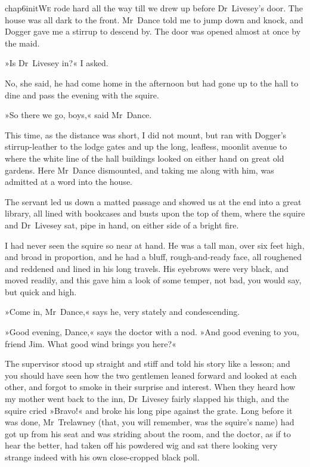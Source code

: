 

\lettrine[lines=5,image=true,findent=2pt]{chap6initW}{e} rode hard all the way till we drew up before Dr~Livesey's door. The house was all dark to the front. Mr~Dance told me to jump down and knock, and Dogger gave me a stirrup to descend by. The door was opened almost at once by the maid.

»Is Dr~Livesey in?« I asked.

No, she said, he had come home in the afternoon but had gone up to the hall to dine and pass the evening with the squire.

»So there we go, boys,« said Mr~Dance.

This time, as the distance was short, I did not mount, but ran with Dogger's stirrup-leather to the lodge gates and up the long, leafless, moonlit avenue to where the white line of the hall buildings looked on either hand on great old gardens. Here Mr~Dance dismounted, and taking me along with him, was admitted at a word into the house.

The servant led us down a matted passage and showed us at the end into a great library, all lined with bookcases and busts upon the top of them, where the squire and Dr~Livesey sat, pipe in hand, on either side of a bright fire.

I had never seen the squire so near at hand. He was a tall man, over six feet high, and broad in proportion, and he had a bluff, rough-and-ready face, all roughened and reddened and lined in his long travels. His eyebrows were very black, and moved readily, and this gave him a look of some temper, not bad, you would say, but quick and high.

»Come in, Mr~Dance,« says he, very stately and condescending.

»Good evening, Dance,« says the doctor with a nod. »And good evening to you, friend Jim. What good wind brings you here?«

The supervisor stood up straight and stiff and told his story like a lesson; and you should have seen how the two gentlemen leaned forward and looked at each other, and forgot to smoke in their surprise and interest. When they heard how my mother went back to the inn, Dr~Livesey fairly slapped his thigh, and the squire cried »Bravo!« and broke his long pipe against the grate. Long before it was done, Mr~Trelawney (that, you will remember, was the squire's name) had got up from his seat and was striding about the room, and the doctor, as if to hear the better, had taken off his powdered wig and sat there looking very strange indeed with his own close-cropped black poll.


